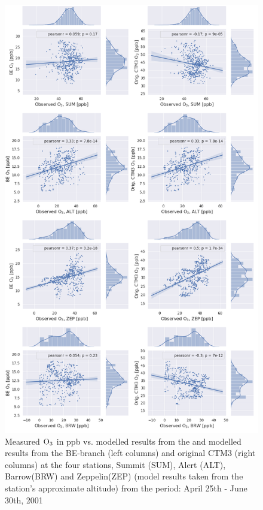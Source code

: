 \begin{figure}[ht]
    \centering
    \includegraphics[width = 0.8\linewidth]{Chapter6_Results/images/Orig_BE_comp/jointplot_AprJune_O3_2001.png}
    \caption{Measured $\mathrm{O_3}$ in ppb vs. modelled results from the and modelled results from the BE-branch (left columns) and original CTM3 (right columns) at the four stations, Summit (SUM), Alert (ALT), Barrow(BRW) and Zeppelin(ZEP) (model results taken from the station's approximate altitude) from the period: April 25th - June 30th, 2001}
    \label{fig:joint_AprMay}
\end{figure}